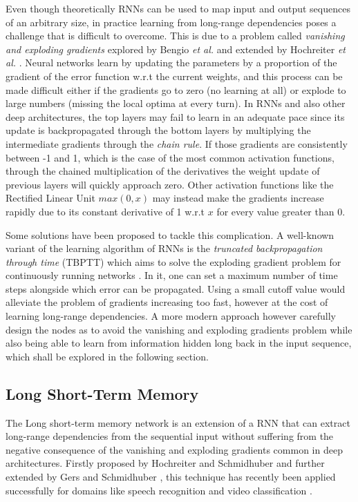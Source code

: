 \documentclass{kththesis}
\begin{document}
Even though theoretically RNNs can be used to map input and output sequences of an arbitrary size, in practice learning from long-range dependencies poses a challenge that is difficult to overcome. This is due to a problem called \emph{vanishing and exploding gradients} explored by Bengio \emph{et al.} \citep{bengio1994learning} and extended by Hochreiter \emph{et al.} \citep{hochreiter2001gradient}. Neural networks learn by updating the parameters by a proportion of the gradient of the error function w.r.t the current weights, and this process can be made difficult either if the gradients go to zero (no learning at all) or explode to large numbers (missing the local optima at every turn). In RNNs and also other deep architectures, the top layers may fail to learn in an adequate pace since its update is backpropagated through the bottom layers by multiplying the intermediate gradients through the \emph{chain rule}. If those gradients are consistently between -1 and 1, which is the case of the most common activation functions, through the chained multiplication of the derivatives the weight update of previous layers will quickly approach zero. Other activation functions like the Rectified Linear Unit $max(0,x)$ may instead make the gradients increase rapidly due to its constant derivative of 1 w.r.t $x$ for every value greater than 0.

Some solutions have been proposed to tackle this complication. A well-known variant of the learning algorithm of RNNs is the \emph{truncated backpropagation through time} (TBPTT) which aims to solve the exploding gradient problem for continuously running networks \citep{williams1989learning}. In it, one can set a maximum number of time steps alongside which error can be propagated. Using a small cutoff value would alleviate the problem of gradients increasing too fast, however at the cost of learning long-range dependencies. A more modern approach however carefully design the nodes as to avoid the vanishing and exploding gradients problem while also being able to learn from information hidden long back in the input sequence, which shall be explored in the following section.

\subsection{Long Short-Term Memory}

The Long short-term memory network is an extension of a RNN that can extract long-range dependencies from the sequential input without suffering from the negative consequence of the vanishing and exploding gradients common in deep architectures. Firstly proposed by Hochreiter and Schmidhuber \citep{hochreiter1997long} and further extended by Gers and Schmidhuber \citep{gers1999learning}, this technique has recently been applied successfully for domains like speech recognition \citep{graves2013speech} and video classification \citep{yue2015beyond}.
\end{document}
